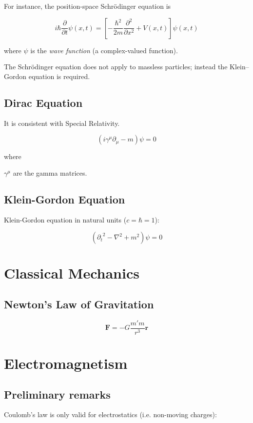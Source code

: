 \documentclass[english, 12pt]{book}
\begin{document}
For instance, the position-space Schrödinger equation is

\[
i \hbar \frac{\partial}{\partial t} \psi(x,t) = \left[ -\frac{\hbar^2}{2m} \frac{\partial^2}{\partial x^2} + V(x,t) \right]  \psi(x,t)
\]

where $\psi$ is the \emph{wave function} (a complex-valued function).

The Schrödinger equation does not apply to massless particles; instead the Klein–Gordon equation is required.

\section{Dirac Equation}

It is consistent with Special Relativity.

\[
\left( i \gamma^{\mu}\partial_{\mu} - m \right) \psi = 0
\]

where

$\gamma^{\mu}$ are the gamma matrices.


\section{Klein-Gordon Equation}
Klein-Gordon equation in natural units ($c=\hbar=1$):

\[
\left({\partial_t}^2 - \nabla^2 + m^2 \right) \psi = 0
\]


\chapter{Classical Mechanics}

\section{Newton's Law of Gravitation}

\[
\mathbf{F} = -G \frac{m'm}{r^3} \mathbf{r}
\]

\chapter{Electromagnetism}

\section{Preliminary remarks}

Coulomb's law is only valid for electrostatics (i.e. non-moving charges):
\end{document}
